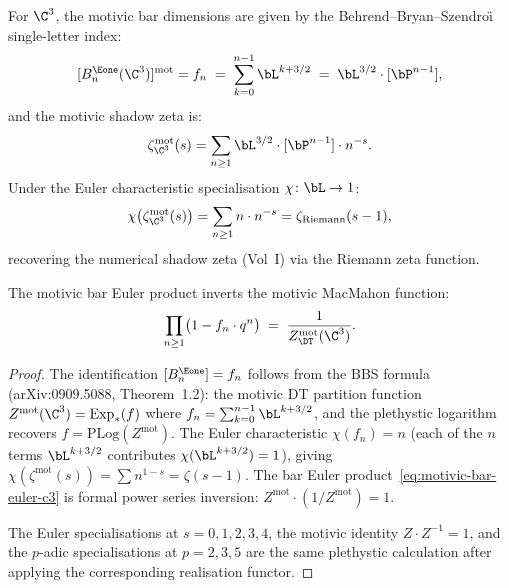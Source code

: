\begin{proposition}
\label{prop:c3-motivic-shadow-zeta}
For $\C^3$, the motivic bar dimensions are given by the Behrend--Bryan--Szendro\"{\i} single-letter index:
\begin{equation}
\label{eq:c3-motivic-bar}
 [B_n^{\Eone}(\C^3)]^{\mathrm{mot}} = f_n \;=\; \sum_{k=0}^{n-1} \bL^{k + 3/2} \;=\; \bL^{3/2} \cdot [\bP^{n-1}],
\end{equation}
and the motivic shadow zeta is:
\begin{equation}
\label{eq:c3-motivic-shadow-zeta-explicit}
 \zeta_{\C^3}^{\mathrm{mot}}(s) = \sum_{n \geq 1} \bL^{3/2} \cdot [\bP^{n-1}] \cdot n^{-s}.
\end{equation}
Under the Euler characteristic specialisation $\chi \colon \bL \to 1$:
\[
 \chi\bigl(\zeta_{\C^3}^{\mathrm{mot}}(s)\bigr) = \sum_{n \geq 1} n \cdot n^{-s} = \zeta_{\mathrm{Riemann}}(s - 1),
\]
recovering the numerical shadow zeta (Vol~I) via the Riemann zeta function.

The motivic bar Euler product inverts the motivic MacMahon function:
\begin{equation}
\label{eq:motivic-bar-euler-c3}
 \prod_{n \geq 1} \bigl(1 - f_n \cdot q^n\bigr) \;=\; \frac{1}{Z^{\mathrm{mot}}_{\DT}(\C^3)}.
\end{equation}
\end{proposition}

\begin{proof}
The identification $[B_n^{\Eone}] = f_n$ follows from the BBS formula (arXiv:0909.5088, Theorem~1.2): the motivic DT partition function $Z^{\mathrm{mot}}(\C^3) = \mathrm{Exp}_*(f)$ where $f_n = \sum_{k=0}^{n-1} \bL^{k+3/2}$, and the plethystic logarithm recovers $f = \mathrm{PLog}(Z^{\mathrm{mot}})$. The Euler characteristic $\chi(f_n) = n$ (each of the $n$ terms $\bL^{k+3/2}$ contributes $\chi(\bL^{k+3/2}) = 1$), giving $\chi(\zeta^{\mathrm{mot}}(s)) = \sum n^{1-s} = \zeta(s-1)$. The bar Euler product~\eqref{eq:motivic-bar-euler-c3} is formal power series inversion: $Z^{\mathrm{mot}} \cdot (1/Z^{\mathrm{mot}}) = 1$.

The Euler specialisations at \(s=0,1,2,3,4\), the motivic identity
\(Z\cdot Z^{-1}=1\), and the \(p\)-adic specialisations at
\(p=2,3,5\) are the same plethystic calculation after applying the
corresponding realisation functor.
\end{proof}

